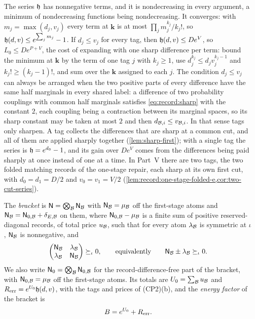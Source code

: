 \begin{remark}[Tags]\label{rem:cp:tags}
The series $\mathfrak h$ has nonnegative terms, and it is nondecreasing in every
argument, a minimum of nondecreasing functions being nondecreasing. It
converges: with $m_j=\max(d_j,v_j)$ every term at $\boldsymbol k$ is at most
$\prod_jm_j^{k_j}/k_j!$, so $\mathfrak h(d,v)\le e^{\sum_jm_j}-1$. If
$d_j\le v_j$ for every tag, then $\mathfrak h(d,v)\le De^V$, so $L_0\le
De^{P+V}$, the cost of expanding with one sharp difference per term: bound
the minimum at $\boldsymbol k$ by the term of one tag $j$ with $k_j\ge1$, use
$d_j^{k_j}\le d_jv_j^{k_j-1}$ and $k_j!\ge(k_j-1)!$, and sum over the
$\boldsymbol k$ assigned to each $j$. The condition $d_j\le v_j$ can always
be arranged when the two positive parts of every difference have the same
half marginals in every shared label: a difference of two probability
couplings with common half marginals satisfies \eqref{eq:record:sharp} with
the constant $2$, each coupling being a contraction between its marginal
spaces, so its sharp constant may be taken at most $2$ and then
$d_{\mathcal B,i}\le v_{\mathcal B,i}$. In that sense tags only sharpen. A tag collects
the differences that are sharp at a common cut, and all of them are applied
sharply together
(\cref{lem:sharp-first}); with a single tag the series is
$\mathfrak h=e^{d_0}-1$, and its gain over $De^V$ comes from the differences being
paid sharply at once instead of one at a time. In Part~V there are two tags,
the two folded matching records of the one-stage repair, each sharp at its
own first cut, with $d_0=d_1=D/2$ and $v_0=v_1=V/2$
(\cref{lem:record:one-stage-folded-e,cor:two-cut-series}).
\end{remark}

\begin{definition}\label{def:cp3}
The \emph{bracket} is $\mathsf N=\bigotimes_{\mathcal B}\mathsf N_{\mathcal B}$ with
$\mathsf N_{\mathcal B}=\mu_{\mathcal B}$ off the first-stage atoms and
$\mathsf N_{\mathcal B}=\mathsf N_{0,\mathcal B}+\delta_{E,\mathcal B}$ on them, where
$\mathsf N_{0,\mathcal B}-\mu_{\mathcal B}$ is a finite sum of positive reserved-diagonal
records, of total price $u_{\mathcal B}$, such that for every atom $\lambda_{\mathcal B}$
is symmetric at $\iota$, $\mathsf N_{\mathcal B}$ is nonnegative, and
\[
 \begin{pmatrix}\mathsf N_{\mathcal B}&\lambda_{\mathcal B}\\ \lambda_{\mathcal B}&\mathsf N_{\mathcal B}
 \end{pmatrix}\succeq_\iota0,\qquad\text{equivalently}\qquad
 \mathsf N_{\mathcal B}\pm\lambda_{\mathcal B}\succeq_\iota0 .
\]
We also write $\mathsf N_0=\bigotimes_\mathcal B\mathsf N_{0,\mathcal B}$ for the
record-difference-free part of the bracket, with
$\mathsf N_{0,\mathcal B}=\mu_\mathcal B$ off the first-stage atoms. Its totals
are $U_0=\sum_\mathcal B u_{\mathcal B}$ and
$R_{\rm err}=e^{U_0}\mathfrak h(d,v)$, with the tags and prices of (CP2)(b), and
the \emph{energy factor} of the bracket is
\[
 B=e^{U_0}+R_{\rm err}.
\]
\end{definition}

